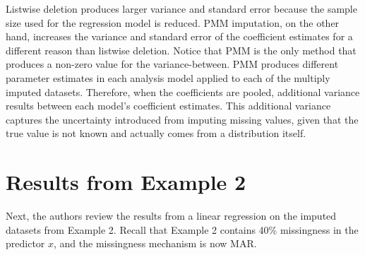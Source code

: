 \documentclass[12pt,oneside]{chicagocapstone}
\begin{document}
Listwise deletion produces larger variance and standard error because
the sample size used for the regression model is reduced. PMM
imputation, on the other hand, increases the variance and standard error
of the coefficient estimates for a different reason than listwise
deletion. Notice that PMM is the only method that produces a non-zero
value for the variance-between. PMM produces different parameter
estimates in each analysis model applied to each of the multiply imputed
datasets. Therefore, when the coefficients are pooled, additional
variance results between each model's coefficient estimates. This
additional variance captures the uncertainty introduced from imputing
missing values, given that the true value is not known and actually
comes from a distribution itself.

\section*{Results from Example 2}\label{results-from-example-2}

Next, the authors review the results from a linear regression on the
imputed datasets from Example 2. Recall that Example 2 contains 40\%
missingness in the predictor \(x\), and the missingness mechanism is now
MAR.
\end{document}
